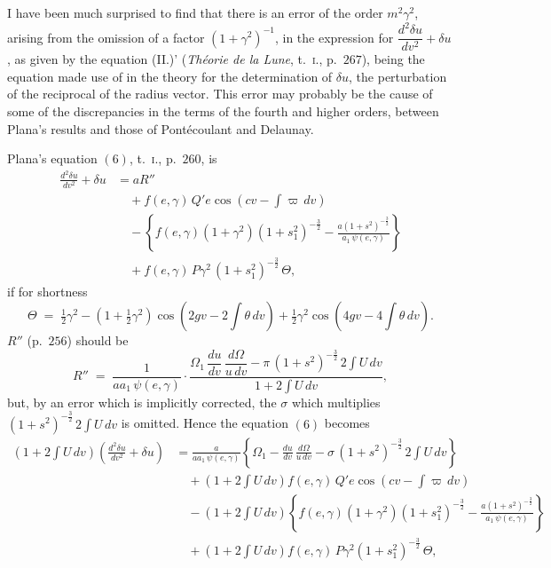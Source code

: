 \documentclass[11pt]{article}
\begin{document}
\medskip

I have been much surprised to find that there is an error of the
order $m^{2}\gamma^{2}$, arising from the omission of a factor
$(1+\gamma^{2})^{-1}$, in the expression for $\dfrac{d^{2}\delta u}{dv^{2}} + \delta u$,
as given by the equation (II.)' (\textit{Th\'eorie de la Lune},
t.\ \textsc{i}., p.\ $267$), being the equation made use of in the
theory for the determination of $\delta u$, the perturbation of the
reciprocal of the radius vector. This error may probably be the cause
of some of the discrepancies in the terms of the fourth and higher
orders, between Plana's results and those of Pont\'ecoulant and
Delaunay.

Plana's equation $(6)$, t.\ \textsc{i}., p.\ $260$, is
\begin{align*}
\frac{d^{2}\delta u}{dv^{2}} + \delta u
&= a R'' \\
&\quad + f(e,\gamma)\, Q'e\cos\!\left(cv - \int\!\varpi\,dv\right) \\
&\quad - \left\{ f(e,\gamma)(1+\gamma^{2})(1+s_{1}^{2})^{-\frac{3}{2}}
   - \frac{a(1+s^{2})^{-\frac{3}{2}}}{a_{1}\,\psi(e,\gamma)} \right\} \\
&\quad + f(e,\gamma)\, P\gamma^{2}\,(1+s_{1}^{2})^{-\frac{3}{2}}\,\Theta,
\end{align*}
if for shortness
\[
\Theta \;=\; \tfrac{1}{2}\gamma^{2}
- \left(1 + \tfrac{1}{2}\gamma^{2}\right)\cos\!\left(2gv - 2\!\int\!\theta\,dv\right)
+ \tfrac{1}{2}\gamma^{2}\cos\!\left(4gv - 4\!\int\!\theta\,dv\right).
\]
$R''$ (p.\ $256$) should be
\[
R'' \;=\; \frac{1}{a a_{1}\,\psi(e,\gamma)}\cdot
\frac{\Omega_{1}\,\dfrac{du}{dv}\,\dfrac{d\Omega}{u\,dv}
- \pi\,(1+s^{2})^{-\frac{3}{2}}\, 2\!\int\!U\,dv}{1 + 2\!\int\!U\,dv},
\]
but, by an error which is implicitly corrected, the $\sigma$ which
multiplies $(1+s^{2})^{-\frac{3}{2}}\, 2\!\int\!U\,dv$ is omitted.
Hence the equation $(6)$ becomes
\begin{align*}
\left(1 + 2\!\int\!U\,dv\right)\!\left(\frac{d^{2}\delta u}{dv^{2}} + \delta u\right)
&= \frac{a}{a a_{1}\,\psi(e,\gamma)}
\left\{ \Omega_{1} - \frac{du}{dv}\,\frac{d\Omega}{u\,dv}
- \sigma\,(1+s^{2})^{-\frac{3}{2}}\, 2\!\int\!U\,dv \right\}\\
&\quad + \left(1 + 2\!\int\!U\,dv\right) f(e,\gamma)\, Q'e\cos\!\left(cv - \int\!\varpi\,dv\right)\\
&\quad - \left(1 + 2\!\int\!U\,dv\right)\!\left\{
   f(e,\gamma)(1+\gamma^{2})(1+s_{1}^{2})^{-\frac{3}{2}}
   - \frac{a(1+s^{2})^{-\frac{3}{2}}}{a_{1}\,\psi(e,\gamma)} \right\}\\
&\quad + \left(1 + 2\!\int\!U\,dv\right) f(e,\gamma)\, P\gamma^{2}(1+s_{1}^{2})^{-\frac{3}{2}}\,\Theta,
\end{align*}
\end{document}
